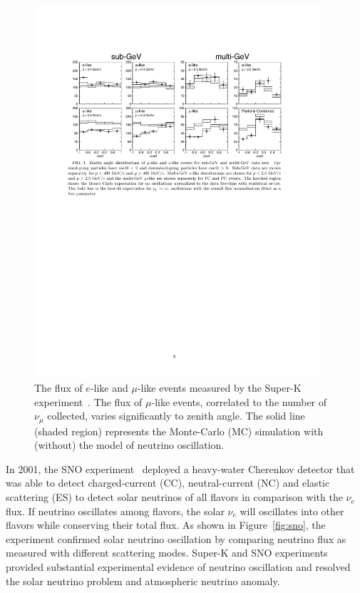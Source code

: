 \begin{figure}[h!]
\centering
\includegraphics[width=0.95\textwidth]{Figures/SuperK.pdf}
\caption[Atmospheric neutrino oscillation]{The flux of $e$-like and $\mu$-like events measured by the Super-K experiment~\cite{bib:SuperK}. 
The flux of $\mu$-like events, correlated to the number of $\nu_\mu$ collected, varies significantly to zenith angle. 
The solid line (shaded region) represents the Monte-Carlo (MC) simulation with (without) the model of neutrino oscillation.  }
\label{fig:SuperK}
\end{figure}

    In 2001, the SNO experiment~\cite{bib:SNO} deployed a heavy-water Cherenkov detector that was able to detect charged-current (CC), neutral-current (NC) and elastic scattering (ES) to detect solar neutrinos of all flavors in comparison with the $\nu_e$ flux.
    If neutrino oscillates among flavors, the solar $\nu_e$ will oscillates into other flavors while conserving their total flux.
    As shown in Figure~\ref{fig:sno}, the experiment confirmed solar neutrino oscillation by comparing neutrino flux as measured with different scattering modes.
    Super-K and SNO experiments provided substantial experimental evidence of neutrino oscillation and resolved the solar neutrino problem and atmospheric neutrino anomaly.
    
